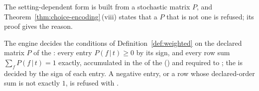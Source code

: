 
The setting-dependent form is built from a stochastic matrix $P$, and
Theorem~\ref{thm:choice-encoding}\,(viii) states that a $P$ that is not one is
refused; its proof gives the reason.

\begin{requirement}\label{req:stochastic-weights}
The engine decides the conditions of Definition~\ref{def:weighted} on the
declared matrix $P$ of the : every entry
$P(f\,|\,t)\ge0$ by its sign, and every row sum $\sum_fP(f\,|\,t)=1$ exactly,
accumulated in the  of the 
() and required to
; the  is
decided by the sign of each entry. A negative entry, or a row whose
declared-order sum is not exactly $1$, is refused with
.
\end{requirement}
